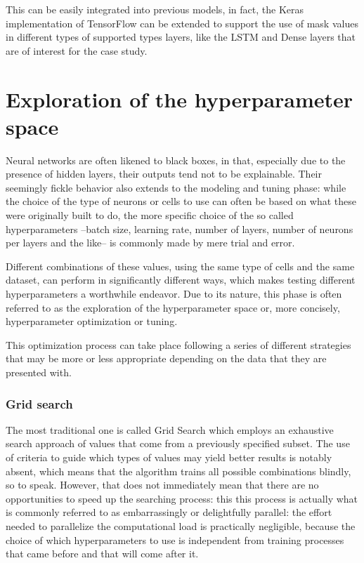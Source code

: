 This can be easily integrated into previous models, in fact, the Keras implementation of TensorFlow can be extended to support the use of mask values in different types of supported types layers, like the LSTM and Dense layers that are of interest for the case study.

\section{Exploration of the hyperparameter space} \label{hyperspace}
Neural networks are often likened to black boxes, in that, especially due to the presence of hidden layers, their outputs tend not to be explainable. 
Their seemingly fickle behavior also extends to the modeling and tuning phase: while the choice of the type of neurons or cells to use can often be based on what these were originally built to do, the more specific choice of the so called hyperparameters –batch size, learning rate, number of layers, number of neurons per layers and the like– is commonly made by mere trial and error.

Different combinations of these values, using the same type of cells and the same dataset, can perform in significantly different ways, which makes testing different hyperparameters a worthwhile endeavor. Due to its nature, this phase is often referred to as the exploration of the hyperparameter space or, more concisely, hyperparameter optimization or tuning. 

This optimization process can take place following a series of different strategies that may be more or less appropriate depending on the data that they are presented with. 
\subsubsection{Grid search}
The most traditional one is called Grid Search \autocite{gridsearch} which employs an exhaustive search approach of values that come from a previously specified subset. The use of criteria to guide which types of values may yield better results is notably absent, which means that the algorithm trains all possible combinations blindly, so to speak. However, that does not immediately mean that there are no opportunities to speed up the searching process: this this process is actually what is commonly referred to as embarrassingly or delightfully parallel: the effort needed to parallelize the computational load is practically negligible, because the choice of which hyperparameters to use is independent from training processes that came before and that will come after it. 

